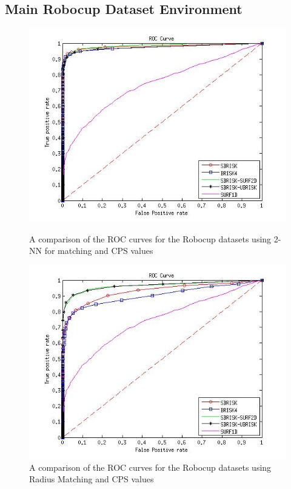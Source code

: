 \documentclass[11pt]{report}
\begin{document}
\subsection{Main Robocup Dataset Environment}
\label{app:mrd}

\begin{figure}[ht!]
\begin{minipage}[b]{0.5\linewidth}
\includegraphics[scale=0.4]{../Drawings/RobocupDataset/ROC_General_KNN_consistent.jpg}
\caption{A comparison of the ROC curves for the Robocup datasets using 2-NN for matching and CPS values}
\label{fig:compareKNNConsist}
\end{minipage}
\hspace{0.5cm}
\begin{minipage}[b]{0.5\linewidth}
\includegraphics[scale=0.4]{../Drawings/RobocupDataset/ROC_General_Hamming_consistent.jpg}
\caption{A comparison of the ROC curves for the Robocup datasets using Radius Matching and CPS values}
\label{fig:compareHammingConsistent}
\end{minipage}
\end{figure}
\end{document}
